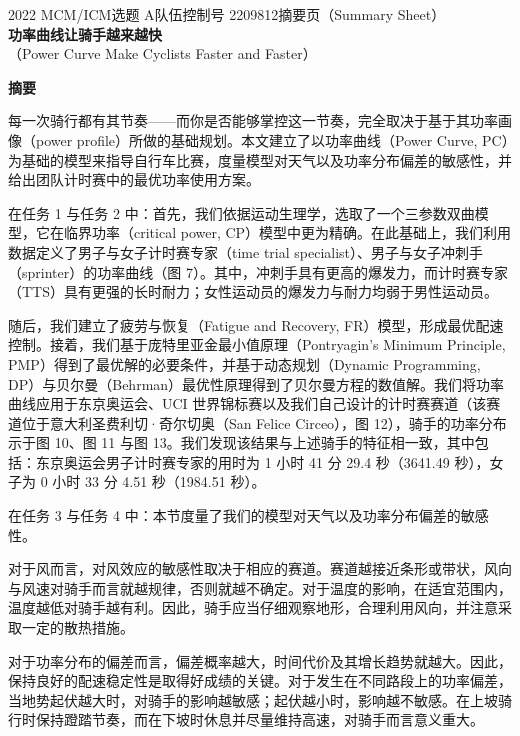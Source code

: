 \documentclass[11pt,a4paper]{ctexart}
\begin{document}
\thispagestyle{empty}
\begin{center}
{\small 2022 MCM/ICM\quad 选题 A\quad 队伍控制号 2209812\quad 摘要页（Summary Sheet）}\\[18pt]
{\LARGE\bfseries 功率曲线让骑手越来越快}\\[8pt]
{\large （Power Curve Make Cyclists Faster and Faster）}\\[10pt]
\end{center}

\begin{center}
{\large\bfseries 摘\quad 要}
\end{center}

\vspace{6pt}
每一次骑行都有其节奏——而你是否能够掌控这一节奏，完全取决于基于其功率画像（power profile）所做的基础规划。本文建立了以功率曲线（Power Curve, PC）为基础的模型来指导自行车比赛，度量模型对天气以及功率分布偏差的敏感性，并给出团队计时赛中的最优功率使用方案。

在任务 1 与任务 2 中：首先，我们依据运动生理学，选取了一个三参数双曲模型，它在临界功率（critical power, CP）模型中更为精确。在此基础上，我们利用数据定义了男子与女子计时赛专家（time trial specialist）、男子与女子冲刺手（sprinter）的功率曲线（图 7）。其中，冲刺手具有更高的爆发力，而计时赛专家（TTS）具有更强的长时耐力；女性运动员的爆发力与耐力均弱于男性运动员。

随后，我们建立了疲劳与恢复（Fatigue and Recovery, FR）模型，形成最优配速控制。接着，我们基于庞特里亚金最小值原理（Pontryagin's Minimum Principle, PMP）得到了最优解的必要条件，并基于动态规划（Dynamic Programming, DP）与贝尔曼（Behrman）最优性原理得到了贝尔曼方程的数值解。我们将功率曲线应用于东京奥运会、UCI 世界锦标赛以及我们自己设计的计时赛赛道（该赛道位于意大利圣费利切·奇尔切奥（San Felice Circeo），图 12），骑手的功率分布示于图 10、图 11 与图 13。我们发现该结果与上述骑手的特征相一致，其中包括：东京奥运会男子计时赛专家的用时为 1 小时 41 分 29.4 秒（3641.49 秒），女子为 0 小时 33 分 4.51 秒（1984.51 秒）。

在任务 3 与任务 4 中：本节度量了我们的模型对天气以及功率分布偏差的敏感性。

对于风而言，对风效应的敏感性取决于相应的赛道。赛道越接近条形或带状，风向与风速对骑手而言就越规律，否则就越不确定。对于温度的影响，在适宜范围内，温度越低对骑手越有利。因此，骑手应当仔细观察地形，合理利用风向，并注意采取一定的散热措施。

对于功率分布的偏差而言，偏差概率越大，时间代价及其增长趋势就越大。因此，保持良好的配速稳定性是取得好成绩的关键。对于发生在不同路段上的功率偏差，当地势起伏越大时，对骑手的影响越敏感；起伏越小时，影响越不敏感。在上坡骑行时保持蹬踏节奏，而在下坡时休息并尽量维持高速，对骑手而言意义重大。
\end{document}
